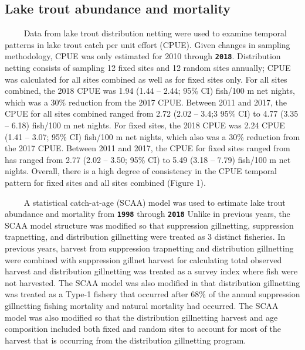 \documentclass[
]{article}
\author{}
\date{}
\begin{document}
\hypertarget{lake-trout-abundance-and-mortality}{%
\subsection{Lake trout abundance and
mortality}\label{lake-trout-abundance-and-mortality}}

~~~~ Data from lake trout distribution netting were used to examine
temporal patterns in lake trout catch per unit effort (CPUE). Given
changes in sampling methodology, CPUE was only estimated for 2010
through \textbf{\texttt{2018}}. Distribution netting consists of
sampling 12 fixed sites and 12 random sites annually; CPUE was
calculated for all sites combined as well as for fixed sites only. For
all sites combined, the 2018 CPUE was 1.94 (1.44 -- 2.44; 95\% CI)
fish/100 m net nights, which was a 30\% reduction from the 2017 CPUE.
Between 2011 and 2017, the CPUE for all sites combined ranged from 2.72
(2.02 -- 3.4;3 95\% CI) to 4.77 (3.35 -- 6.18) fish/100 m net nights.
For fixed sites, the 2018 CPUE was 2.24 CPUE (1.41 -- 3.07; 95\% CI)
fish/100 m net nights, which also was a 30\% reduction from the 2017
CPUE. Between 2011 and 2017, the CPUE for fixed sites ranged from has
ranged from 2.77 (2.02 -- 3.50; 95\% CI) to 5.49 (3.18 -- 7.79) fish/100
m net nights. Overall, there is a high degree of consistency in the CPUE
temporal pattern for fixed sites and all sites combined (Figure 1).

~~~~ A statistical catch-at-age (SCAA) model was used to estimate lake
trout abundance and mortality from \textbf{\texttt{1998}} through
\textbf{\texttt{2018}} Unlike in previous years, the SCAA model
structure was modified so that suppression gillnetting, suppression
trapnetting, and distribution gillnetting were treated as 3 distinct
fisheries. In previous years, harvest from suppression trapnetting and
distribution gillnetting were combined with suppression gillnet harvest
for calculating total observed harvest and distribution gillnetting was
treated as a survey index where fish were not harvested. The SCAA model
was also modified in that distribution gillnetting was treated as a
Type-1 fishery that occurred after 68\% of the annual suppression
gillnetting fishing mortality and natural mortality had occurred. The
SCAA model was also modified so that the distribution gillnetting
harvest and age composition included both fixed and random sites to
account for most of the harvest that is occurring from the distribution
gillnetting program.
\end{document}
